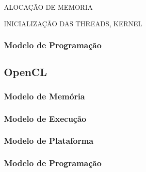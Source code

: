 ALOCAÇÃO DE MEMORIA

INICIALIZAÇÃO DAS THREADS, KERNEL
\subsubsection{Modelo de Programação}

\subsection{OpenCL}
\subsubsection{Modelo de Memória}
\subsubsection{Modelo de Execução}
\subsubsection{Modelo de Plataforma}
\subsubsection{Modelo de Programação}
